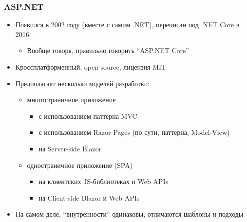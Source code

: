 \documentclass{../../slides-style}
\begin{document}
    \begin{frame}
        \frametitle{ASP.NET}
        \begin{itemize}
            \item Появился в 2002 году (вместе с самим .NET), переписан под .NET Core в 2016
            \begin{itemize}
                \item Вообще говоря, правильно говорить ``ASP.NET Core''
            \end{itemize}
            \item Кроссплатформенный, open-source, лицензия MIT
            \item Предполагает несколько моделей разработки:
            \begin{itemize}
                \item многостраничное приложение
                \begin{itemize}
                    \item с использованием паттерна MVC
                    \item с использованием Razor Pages (по сути, паттерна, Model-View)
                    \item на Server-side Blazor
                \end{itemize}
                \item одностраничное приложение (SPA)
                \begin{itemize}
                    \item на клиентских JS-библиотеках и Web APIs
                    \item на Client-side Blazor и Web APIs
                \end{itemize}
            \end{itemize}
            \item На самом деле, ``внутренности'' одинаковы, отличаются шаблоны и подходы
        \end{itemize}
    \end{frame}
\end{document}

